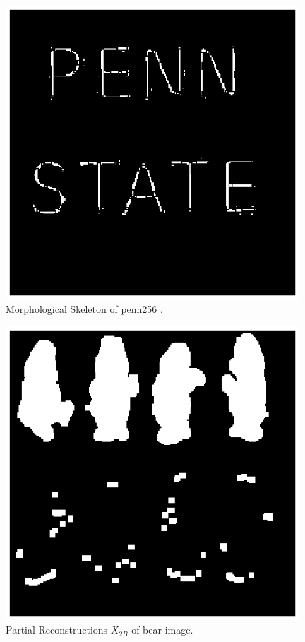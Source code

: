 \documentclass[paper=a4, fontsize=11pt]{scrartcl}
\begin{document}
\begin{figure}
	\centering
	\includegraphics[width=11cm]{skpenn.eps}
	\caption{Morphological Skeleton of penn256 .}
	\label{fig:8}
\end{figure}


\begin{figure}
	\centering
	\includegraphics[width=11cm]{X2Bbear.eps}
	\caption{Partial Reconstructions $X_{2B}$ of bear image.}
	\label{fig:9}
\end{figure}
\end{document}
